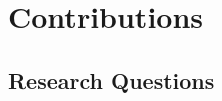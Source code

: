 




\section{Contributions}
\label{intro_contributions}

\subsection{Research Questions}
\label{intro_rqs}

